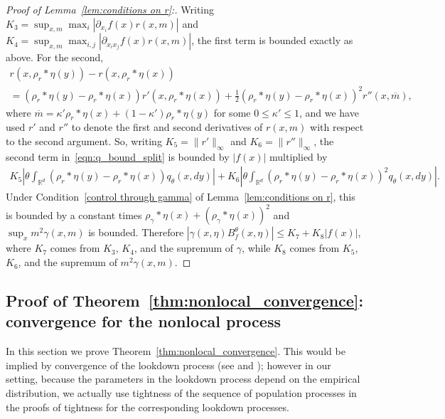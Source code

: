 \documentclass[EJP]{ejpecp} %
\newcommand{\IR}{\mathbb R}
\newcommand{\kernel}{\rho}  %
\newcommand{\smooth}[1]{\kernel_{#1} \! * \!}  %
\newcommand{\citet}[1]{\cite{#1}}
\begin{document}
\begin{proof}[Proof of Lemma~\ref{lem:conditions on r}:]
Writing
$K_3 = \sup_{x,m} \max_i |\partial_{x_i} f(x)r(x, m)|$
and 
$K_4 = \sup_{x,m} \max_{i,j} |\partial_{x_i x_j} f(x)r(x, m)|$,
the first term is bounded exactly as above. For the second, 
    \begin{multline*}
        r(x, \smooth{r}\eta(y)) - r(x, \smooth{r}\eta(x))
        \\
        =
        (\smooth{r}\eta(y) - \smooth{r}\eta(x)) r'(x,\smooth{r}\eta(x))
        + \frac{1}{2} (\smooth{r}\eta(y) - \smooth{r}\eta(x))^2 r''(x, \overline{m}),
    \end{multline*}
    where $\overline{m}= \kappa'\smooth{r}\eta(x) +(1-\kappa') 
\smooth{r}\eta(y)$ for some $0\leq \kappa'\leq 1$, and
    we have used $r'$ and $r''$ to denote the first and second derivatives of $r(x,m)$
with respect to the second argument.
    So, writing $K_5=\|r'\|_\infty$ and $K_6=\|r''\|_\infty$,
    the second term in~\eqref{eqn:q_bound_split} is bounded by $|f(x)|$ multiplied by
    \begin{align*}
       K_5
        \left|
            \theta \int_{\IR^d}
                (\smooth{r}\eta(y) - \smooth{r}\eta(x))
            q_\theta(x, dy)
        \right|
        +
       K_6
        \left|
            \theta \int_{\IR^d}
                (\smooth{r}\eta(y) - \smooth{r}\eta(x))^2
            q_\theta(x, dy)
        \right| .
    \end{align*}
Under Condition~\ref{control through gamma} of 
Lemma~\ref{lem:conditions on r}, this is bounded by 
a constant times $\smooth{\gamma}\eta(x)+(\smooth{\gamma}\eta(x))^2$ and 
$\sup_x m^2\gamma(x, m)$ is bounded.
Therefore $|\gamma(x,\eta) B^\theta_f(x,\eta)| \le K_7 + K_8 |f(x)|$,
where $K_7$ comes from $K_3$, $K_4$, and the supremum of $\gamma$,
while $K_8$ comes from $K_5$, $K_6$, and the supremum of $m^2 \gamma(x,m)$.
\end{proof}


\subsection{Proof of Theorem~\ref{thm:nonlocal_convergence}: convergence for the nonlocal process}
    \label{sec:population_density_proof}

In this section we prove Theorem~\ref{thm:nonlocal_convergence}.
This would be implied by convergence of the lookdown process
(see \citet{kurtz/rodrigues:2011} and \citet{etheridge/kurtz:2019});
however in our setting,
because the parameters in the lookdown process
depend on the empirical distribution,
we actually use tightness of the sequence of population processes
in the proofs of tightness for the corresponding lookdown processes.
\end{document}
